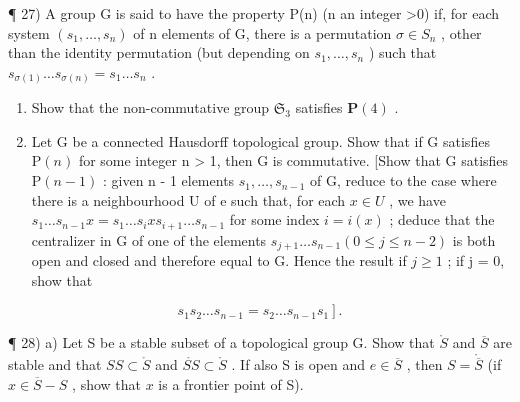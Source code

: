 ¶ 27) A group G is said to have the property P(n) (n an integer \textgreater0) if, for each system \((s_{1}, \ldots, s_{n})\) of n elements of G, there is a permutation \(\sigma \in S_{n}\) , other than the identity permutation (but depending on \(s_{1}, \ldots, s_{n}\) ) such that \(s_{\sigma(1)} \ldots s_{\sigma(n)} = s_{1} \ldots s_{n}\) .

\begin{enumerate}
\def\labelenumi{\alph{enumi})}
\item
  Show that the non-commutative group \(\mathfrak{S}_3\) satisfies \(\mathbf{P}(4)\) .
\item
  Let G be a connected Hausdorff topological group. Show that if G satisfies \(\mathrm{P}(n)\) for some integer n \textgreater{} 1, then G is commutative. {[}Show that G satisfies \(\mathrm{P}(n - 1)\) : given n - 1 elements \(s_{1}, \ldots, s_{n-1}\) of G, reduce to the case where there is a neighbourhood U of e such that, for each \(x \in U\) , we have \(s_{1} \ldots s_{n-1}x = s_{1} \ldots s_{i}xs_{i+1} \ldots s_{n-1}\) for some index \(i = i(x)\) ; deduce that the centralizer in G of one of the elements \(s_{j+1} \ldots s_{n-1} (0 \leqslant j \leqslant n - 2)\) is both open and closed and therefore equal to G. Hence the result if \(j \geqslant 1\) ; if j = 0, show that
\end{enumerate}

\[
\left. s _ {1} s _ {2} \dots s _ {n - 1} = s _ {2} \dots s _ {n - 1} s _ {1} \right].
\]

¶ 28) a) Let S be a stable subset of a topological group G. Show that \(\mathring{S}\) and \(\overline{S}\) are stable and that \(SS\subset\mathring{S}\) and \(\mathring{SS}\subset\mathring{S}\) . If also S is open and \(e\in\overline{S}\) , then \(S=\mathring{\overline{S}}\) (if \(x\in\overline{S}-S\) , show that \(x\) is a frontier point of S).

